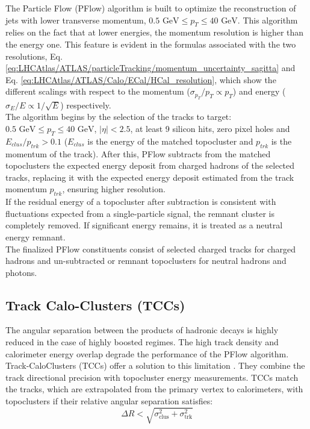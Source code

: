 The Particle Flow (PFlow) algorithm \cite{ATLAS_PFlow} is built to optimize the reconstruction of jets with lower transverse momentum, $0.5\text{ GeV} \le p_{T} \le 40\text{ GeV}$.
This algorithm relies on the fact that at lower energies, the momentum resolution is higher than the energy one.
This feature is evident in the formulas associated with the two resolutions, Eq. \ref{eq:LHCAtlas/ATLAS/particleTracking/momentum_uncertainty_sagitta} and Eq. \ref{eq:LHCAtlas/ATLAS/Calo/ECal/HCal_resolution}, which show the different scalings with respect to the momentum ($\sigma_{p_{T}}/p_{T} \propto p_{T}$) and energy ($\sigma_E/E \propto 1/\sqrt{E}$) respectively.\\
The algorithm begins by the selection of the tracks to target: $0.5\text{ GeV} \le p_{T} \le 40\text{ GeV}$, $|\eta| < 2.5$, at least 9 silicon hits, zero pixel holes and $E_{clus} / p_{trk} > 0.1$ ($E_{clus}$ is the energy of the matched topocluster and $p_{trk}$ is the momentum of the track).
After this, PFlow subtracts from the matched topoclusters the expected energy deposit from charged hadrons of the selected tracks, replacing it with the expected energy deposit estimated from the track momentum $p_{trk}$, ensuring higher resolution.\\
If the residual energy of a topocluster after subtraction is consistent with fluctuations expected from a  single-particle signal, the remnant cluster is completely removed. 
If significant energy remains, it is treated as a neutral energy remnant.\\
The finalized PFlow constituents consist of selected charged tracks for charged hadrons and un-subtracted or remnant topoclusters for neutral hadrons and photons.

\subsection*{Track Calo-Clusters (TCCs)}\label{sec:Reco/Jets/Components/TCC}

The angular separation between the products of hadronic decays is highly reduced in the case of highly boosted regimes.
The high track density and calorimeter energy overlap degrade the performance of the PFlow algorithm.
Track-CaloClusters (TCCs) offer a solution to this limitation \cite{ATLAS_TCC}.
They combine the track directional precision with topocluster energy measurements.
TCCs match the tracks, which are extrapolated from the primary vertex to calorimeters, with topoclusters if their relative angular separation satisfies:
\begin{equation}\label{eq:Reco/Jets/Components/TCC/dR}
\Delta R < \sqrt{\sigma_{\text{clus}}^2 + \sigma_{\text{trk}}^2}
\end{equation}

